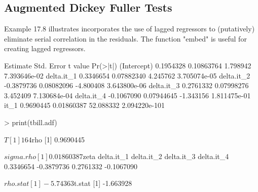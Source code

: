 \begin{Schunk}
\end{Schunk}
\subsection{Augmented Dickey Fuller Tests}
Example 17.8 illustrates incorporates the use of lagged regressors to (putatively) eliminate serial
correlation in the residuals.  The function "embed" is useful for creating lagged regressors.
\begin{Schunk}
\begin{Soutput}
              Estimate Std. Error   t value      Pr(>|t|)
(Intercept)  0.1954328 0.10863764  1.798942  7.393646e-02
delta.it_1   0.3346654 0.07882340  4.245762  3.705074e-05
delta.it_2  -0.3879736 0.08082096 -4.800408  3.643800e-06
delta.it_3   0.2761332 0.07998276  3.452409  7.130684e-04
delta.it_4  -0.1067090 0.07944645 -1.343156  1.811475e-01
it_1         0.9690445 0.01860387 52.088332 2.094220e-101
\end{Soutput}
\begin{Sinput}
> print(tbill.adf)
\end{Sinput}
\begin{Soutput}
$T
[1] 164

$rho
[1] 0.9690445

$sigma.rho
[1] 0.01860387

$zeta
delta.it_1 delta.it_2 delta.it_3 delta.it_4 
 0.3346654 -0.3879736  0.2761332 -0.1067090 

$rho.stat
[1] -5.74363

$t.stat
[1] -1.663928
\end{Soutput}
\end{Schunk}
